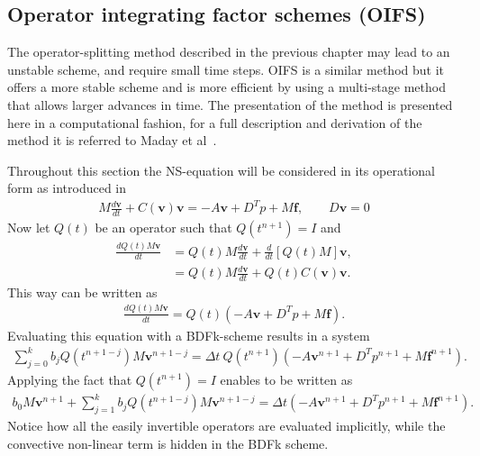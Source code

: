 \subsection{Operator integrating factor schemes (OIFS)}\label{OIFS}
The operator-splitting method described in the previous chapter may lead to an unstable scheme, 
and require small time steps.
OIFS is a similar method but it offers a more stable scheme and is more efficient by using a multi-stage method that allows 
larger advances in time. The presentation of the method is presented here in a computational fashion,
for a full description and derivation of the method it is referred to Maday et al~\cite{raey}.

Throughout this section the NS-equation will be considered in its operational form as introduced in~
%
\begin{align}
    M\frac{d \mathbf{v}}{dt} + C(\mathbf{v})\mathbf{v} = -A\mathbf{v} +D^T p +M\mathbf{f}, \qquad D\mathbf{v} = 0
    \label{eq:NSoperator}
\end{align}
%
Now let $Q(t)$ be an operator such that $Q(t^{n+1}) = I$ and 
%
\begin{align}
    \frac{dQ(t)M\mathbf{v}}{dt} &=  Q(t)M\frac{d\mathbf{v}}{dt} + \frac{d}{dt}\left[  Q(t)M\right]\mathbf{v},\\
    &= Q(t)M\frac{d\mathbf{v}}{dt} + Q(t)C(\mathbf{v})\mathbf{v}. 
    \label{eq:integrationalfactor}
\end{align}
%
This way  can be written as 
\begin{align}
    \frac{d Q(t)M\mathbf{v}}{dt} =Q(t)( -A\mathbf{v} +D^T p +M\mathbf{f}).
    \label{eq:NSoperatorOIFS}
\end{align}
Evaluating this equation with a BDFk-scheme results in a system 
\begin{align}
    \sum_{j=0}^{k}b_jQ(t^{n+1-j})M\mathbf{v}^{n+1-j} =\Delta t \: Q(t^{n+1})( -A\mathbf{v}^{n+1} +D^T p^{n+1} +M\mathbf{f}^{n+1}).
    \label{eq:NSOIFS1}
\end{align}
Applying the fact that $Q(t^{n+1}) = I$ enables  to be written as 
\begin{align}
    b_0M\mathbf{v}^{n+1} + \sum_{j=1}^{k}b_jQ(t^{n+1-j})M\mathbf{v}^{n+1-j} 
    =\Delta t ( -A\mathbf{v}^{n+1} +D^T p^{n+1} +M\mathbf{f}^{n+1}).
    \label{eq:NSOIFS1}
\end{align}
Notice how all the easily invertible operators are evaluated implicitly, while the convective non-linear term is hidden in the BDFk scheme. 
